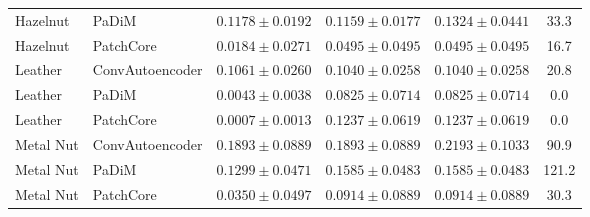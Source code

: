 \begin{table}[t]
{\begin{tabular}{llcccc}
Hazelnut & PaDiM & $0.1178 \pm 0.0192$ & $0.1159 \pm 0.0177$ & $0.1324 \pm 0.0441$ & 33.3 \\
Hazelnut & PatchCore & $0.0184 \pm 0.0271$ & $0.0495 \pm 0.0495$ & $0.0495 \pm 0.0495$ & 16.7 \\
\midrule
Leather & ConvAutoencoder & $0.1061 \pm 0.0260$ & $0.1040 \pm 0.0258$ & $0.1040 \pm 0.0258$ & 20.8 \\
Leather & PaDiM & $0.0043 \pm 0.0038$ & $0.0825 \pm 0.0714$ & $0.0825 \pm 0.0714$ & 0.0 \\
Leather & PatchCore & $0.0007 \pm 0.0013$ & $0.1237 \pm 0.0619$ & $0.1237 \pm 0.0619$ & 0.0 \\
\midrule
Metal Nut & ConvAutoencoder & $0.1893 \pm 0.0889$ & $0.1893 \pm 0.0889$ & $0.2193 \pm 0.1033$ & 90.9 \\
Metal Nut & PaDiM & $0.1299 \pm 0.0471$ & $0.1585 \pm 0.0483$ & $0.1585 \pm 0.0483$ & 121.2 \\
Metal Nut & PatchCore & $0.0350 \pm 0.0497$ & $0.0914 \pm 0.0889$ & $0.0914 \pm 0.0889$ & 30.3 \\
\bottomrule
\end{tabular}}
\end{table}
